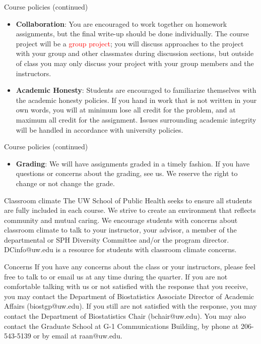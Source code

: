 \documentclass[10pt,t]{beamer}
\begin{document}
\begin{frame}{Course policies (continued)}
\begin{itemize}
	\item \textbf{Collaboration}: You are encouraged to work together on homework assignments, but the final write-up should be done individually. The course project will be a \textcolor{red}{group project}; you will discuss approaches to the project with your group and other classmates during discussion sections, but outside of class you may only discuss your project with your group members and the instructors.
	\item \textbf{Academic Honesty}: Students are encouraged to familiarize themselves with the academic honesty policies. If you hand in work that is not written in your own words, you will at minimum lose all credit for the problem, and at maximum all credit for the assignment. Issues surrounding academic integrity will be handled in accordance with university policies.
\end{itemize}
\end{frame}

\begin{frame}{Course policies (continued)}
\begin{itemize}
	\item \textbf{Grading}: We will have assignments graded in a timely fashion. If you have questions or concerns about the grading, see us. We reserve the right to change or not change the grade.
\end{itemize}
\end{frame}

\begin{frame}{Classroom climate}
The UW School of Public Health seeks to ensure all students are fully included in each course. We strive to create an environment that reflects community and mutual caring. We encourage students with concerns about classroom climate to talk to your instructor, your advisor, a member of the departmental or SPH Diversity Committee and/or the program director. DCinfo@uw.edu is a resource for students with classroom climate concerns.
\end{frame}

\begin{frame}{Concerns}
If you have any concerns about the class or your instructors, please feel free to talk to or email us at any time during the quarter. If you are not comfortable talking with us or not satisfied with the response that you receive, you may contact the Department of Biostatistics Associate Director of Academic Affairs (biostgp@uw.edu). If you still are not satisfied with the response, you may contact the Department of Biostatistics Chair (bchair@uw.edu). You may also contact the Graduate School at G-1 Communications Building, by phone at 206-543-5139 or by email at raan@uw.edu.
\end{frame}
\end{document}
